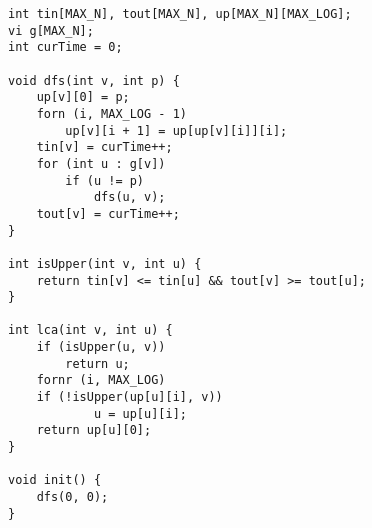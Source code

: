 \begin{verbatim}
int tin[MAX_N], tout[MAX_N], up[MAX_N][MAX_LOG];
vi g[MAX_N];
int curTime = 0;

void dfs(int v, int p) {			   	
	up[v][0] = p;
	forn (i, MAX_LOG - 1)
		up[v][i + 1] = up[up[v][i]][i];	
 	tin[v] = curTime++;
	for (int u : g[v])
		if (u != p)
			dfs(u, v); 	
 	tout[v] = curTime++;
}

int isUpper(int v, int u) {
	return tin[v] <= tin[u] && tout[v] >= tout[u];
}

int lca(int v, int u) {
	if (isUpper(u, v))
		return u;
	fornr (i, MAX_LOG) 
	if (!isUpper(up[u][i], v))
			u = up[u][i];
	return up[u][0];
}

void init() {
	dfs(0, 0);
}
\end{verbatim}

